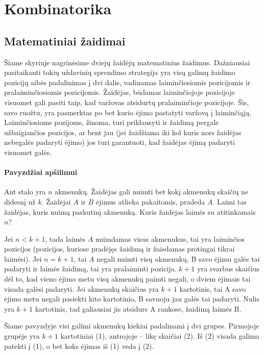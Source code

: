 \chapter{Kombinatorika}
\thispagestyle{empty}

\section{Matematiniai žaidimai}

Šiame skyriuje nagrinėsime dviejų žaidėjų matematinius žaidimus.
Dažniausiai pasitaikanti tokių uždavinių sprendimo strategija yra visų
galimų žaidimo pozicijų aibės padalinimas į dvi dalis, vadinamas laiminčiosiomis
pozicijomis ir pralaiminčiosiomis pozicijomis. Žaidėjas, būdamas
laiminčiojoje pozicijoje visuomet gali paeiti taip, kad varžovas atsidurtų
pralaiminčioje pozicijoje. Šis, savo ruožtu, yra pasmerktas po bet kurio
ėjimo pastatyti varžovą į laiminčiąją. Laiminčiosioms pozijoms, žinoma,
turi priklausyti ir žaidimą pergale užbaigiančios pozicijos, ar bent jau (jei
žaidžiama iki kol kuris nors žaidėjas nebegalės padaryti ėjimo) jos turi
garantuoti, kad žaidėjas ėjimą padaryti visuomet galės. 


\subsubsection{Pavyzdžiai apšilimui}

\begin{pavnr}
  Ant stalo yra $n$ akmenukų. Žaidėjas gali nuimti bet kokį akmenukų skaičių
  ne didesnį už $k$. Žaidėjai $A$ ir $B$ ėjimus atlieka pakaitomis, pradeda $A$.
  Laimi tas žaidėjas, kuris nuimą paskutinį akmenuką. Kuris žaidėjas laimės
  su atitinkamais $n$?
  \label{n/kakmenukų}
\end{pavnr}

\begin{sprendimas}
Jei  $n<k+1$, tada laimės $A$ nuimdamas visus akmenukus, tai yra laiminčios pozicijos (pozicijos, kuriose pradėjęs žaidimą ir žaisdamas protingai tikrai laimėsi). Jei $n=k+1$, tai $A$ negali nuimti visų akmenukų, B savo ėjimu galės tai padaryti ir laimės
žaidimą, tai yra pralaiminti pozicija. $k+1$ yra svarbus skaičius dėl to, kad vieno ėjimo metu visų akmenukų paimti negali, o dviem ėjimais tai visada galėsi padaryti. Jei akmenukų skaičius yra $k+1$ kartotinis, tai A savo ėjimo metu negali pasiekti
kito kartotinio, B savuoju jau galės tai padaryti. Nulis yra $k+1$ kartotinis, tad galiausiai jis atsidurs A rankose, žaidimą laimės B. 

\end{sprendimas}
Šiame pavyzdyje visi galimi akmenukų kiekiai
padalinami į dvi grupes. Pirmojoje grupėje yra $k+1$ kartotiniai (1),
antrojoje – likę skaičiai (2). Iš (2) visada galima patekti į (1), o bet
koks ėjimas iš (1) veda į (2). 

